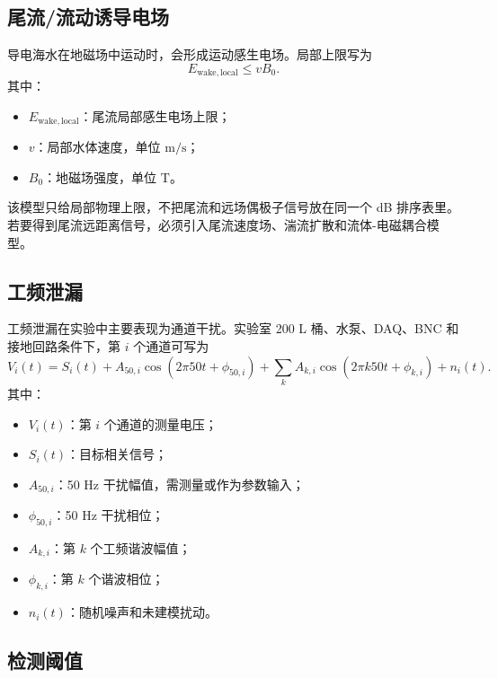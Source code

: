 \subsection{尾流/流动诱导电场}

导电海水在地磁场中运动时，会形成运动感生电场。局部上限写为
\begin{equation}
    E_{\mathrm{wake,local}}\le vB_0.
    \label{eq:wake_local}
\end{equation}
其中：
\begin{itemize}
    \item $E_{\mathrm{wake,local}}$：尾流局部感生电场上限；
    \item $v$：局部水体速度，单位 $\mathrm{m/s}$；
    \item $B_0$：地磁场强度，单位 $\mathrm{T}$。
\end{itemize}

该模型只给局部物理上限，不把尾流和远场偶极子信号放在同一个 dB 排序表里。若要得到尾流远距离信号，必须引入尾流速度场、湍流扩散和流体-电磁耦合模型。

\subsection{工频泄漏}

工频泄漏在实验中主要表现为通道干扰。实验室 200 L 桶、水泵、DAQ、BNC 和接地回路条件下，第 $i$ 个通道可写为
\begin{equation}
    V_i(t)=S_i(t)+A_{50,i}\cos(2\pi50t+\phi_{50,i})
    +\sum_k A_{k,i}\cos(2\pi k50t+\phi_{k,i})+n_i(t).
    \label{eq:lab_powerline}
\end{equation}
其中：
\begin{itemize}
    \item $V_i(t)$：第 $i$ 个通道的测量电压；
    \item $S_i(t)$：目标相关信号；
    \item $A_{50,i}$：50 Hz 干扰幅值，需测量或作为参数输入；
    \item $\phi_{50,i}$：50 Hz 干扰相位；
    \item $A_{k,i}$：第 $k$ 个工频谐波幅值；
    \item $\phi_{k,i}$：第 $k$ 个谐波相位；
    \item $n_i(t)$：随机噪声和未建模扰动。
\end{itemize}

\subsection{检测阈值}

